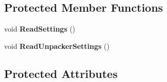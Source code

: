 \subsection*{Protected Member Functions}
\begin{DoxyCompactItemize}
\item 
\mbox{\label{class_global_settings_a4ff35326d7293d230edd31fbf67bb10b}} 
void {\bfseries Read\+Settings} ()
\item 
\mbox{\label{class_global_settings_ac91eec1a20a1366ec4859dd06249cf6d}} 
void {\bfseries Read\+Unpacker\+Settings} ()
\end{DoxyCompactItemize}
\subsection*{Protected Attributes}
